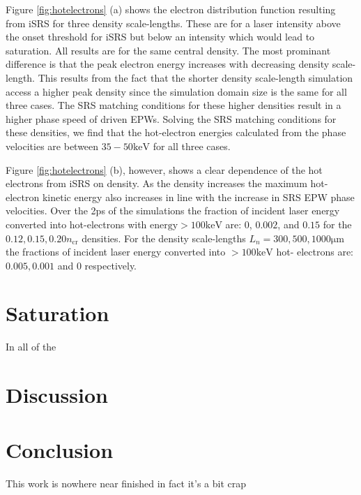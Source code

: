 Figure \ref{fig:hotelectrons} (a) shows the
electron distribution function resulting from iSRS for three density scale-lengths. These are for a laser intensity
above the onset threshold for iSRS but below an intensity which would lead to saturation. All results are
for the same central density. The most prominant difference is that the peak electron energy increases with
decreasing density scale-length. This results from the fact that the shorter density scale-length simulation
access a higher peak density since the simulation domain size is the same for all three cases. The SRS
matching conditions for these higher densities result in a higher phase speed of driven EPWs. Solving the
SRS matching conditions for these densities, we find that the hot-electron energies calculated from the phase
velocities are between $35 - 50 \si{\kilo \electronvolt}$ for all three cases.


Figure \ref{fig:hotelectrons} (b), however, shows a clear dependence of the hot
electrons from iSRS on density. As the density increases the maximum hot-
electron kinetic energy also increases in line with the increase in SRS EPW
phase velocities.
Over the 2ps of the simulations the fraction of incident laser energy converted
into hot-electrons with $\mathrm{energy} > 100\si{\kilo \electronvolt}$ are: 0,
$0.002$, and $0.15$ for the $0.12,0.15,0.20 n_\mathrm{cr}$ densities. For the
density scale-lengths $L_n=300,500,1000\si{\micro\metre}$ the fractions of
incident laser energy converted into $> 100\si{\kilo \electronvolt}$ hot-
electrons are: $0.005,0.001$ and $0$ respectively.





\section{Saturation}
In all of the 

\section{Discussion}

\section{Conclusion}\label{sec:conclusion}

This work is nowhere near finished in fact it's a bit crap

%
